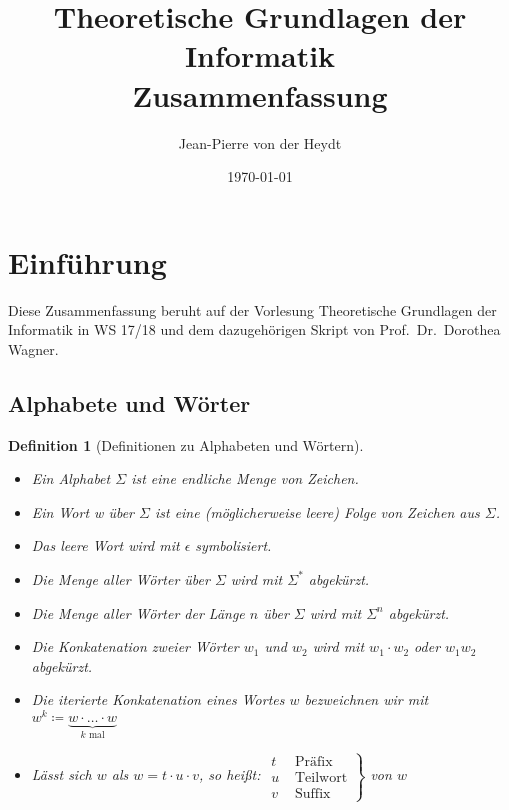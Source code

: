 \documentclass[11pt]{article}
\title{Theoretische Grundlagen der Informatik\\ Zusammenfassung}
\author{Jean-Pierre von der Heydt}
\date{\today}
\theoremstyle{break}
\newtheorem{defi}[satz]{Definition}
\begin{document}
    \maketitle
    \pagebreak

    \tableofcontents
    \pagebreak



    \section{Einführung}
	\label{sec:einführung}

    Diese Zusammenfassung beruht auf der Vorlesung Theoretische Grundlagen der Informatik in WS 17/18 und dem dazugehörigen Skript von Prof.\ Dr.\ Dorothea Wagner.

    \subsection{Alphabete und Wörter}
	\label{subsec:alphabeteindexund-wörterindex}

    \begin{defi}[Definitionen zu Alphabeten und Wörtern]
        \begin{itemize}
            \item Ein Alphabet $\Sigma$ ist eine endliche Menge von Zeichen.
            \item Ein Wort w über $\Sigma$ ist eine (möglicherweise leere) Folge von Zeichen aus $\Sigma$.
            \item Das leere Wort wird mit $\epsilon$ symbolisiert.
            \item Die Menge aller Wörter über $\Sigma$ wird mit $\Sigma^*$ abgekürzt.
            \item Die Menge aller Wörter der Länge $n$ über $\Sigma$ wird mit $\Sigma^n$ abgekürzt.
            \item Die Konkatenation zweier Wörter $w_1$ und $w_2$ wird mit $w_1\cdot w_2$ oder $w_{1}w_{2}$ abgekürzt.
            \item Die iterierte Konkatenation eines Wortes $w$ bezweichnen wir mit $w^k\coloneqq \underbrace{w\cdot\dots\cdot w}_{k\text{ mal}}$
            \item Lässt sich $w$ als $w=t\cdot u\cdot v$, so heißt:
            $\left. \begin{array}{cc}
                        t &\text{ Präfix}\\
                        u &\text{ Teilwort}\\
                        v &\text{ Suffix}
            \end{array} \right\}$
            von $w$
        \end{itemize}
    \end{defi}
\end{document}
